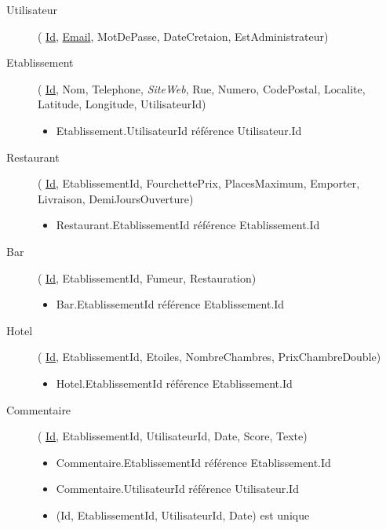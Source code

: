 \documentclass[10pt,a4paper]{article}
\begin{document}
\begin{description}
\item[Utilisateur](
    \underline{Id},
    \underline{Email},
    MotDePasse,
    DateCretaion,
    EstAdministrateur)

\item[Etablissement](
    \underline{Id},
    Nom,
    Telephone,
    \textit{SiteWeb},
    Rue,
    Numero,
    CodePostal,
    Localite,
    Latitude,
    Longitude,
    UtilisateurId)

    \begin{itemize}
        \item Etablissement.UtilisateurId référence Utilisateur.Id
    \end{itemize}

\item[Restaurant](
    \underline{Id},
    EtablissementId,
    FourchettePrix,
    PlacesMaximum,
    Emporter,
    Livraison,
    DemiJoursOuverture)

    \begin{itemize}
        \item Restaurant.EtablissementId référence Etablissement.Id
    \end{itemize}

\item[Bar](
    \underline{Id},
    EtablissementId,
    Fumeur,
    Restauration)

    \begin{itemize}
        \item Bar.EtablissementId référence Etablissement.Id
    \end{itemize}

\item[Hotel](
    \underline{Id},
    EtablissementId,
    Etoiles,
    NombreChambres,
    PrixChambreDouble)

    \begin{itemize}
        \item Hotel.EtablissementId référence Etablissement.Id
    \end{itemize}

\item[Commentaire](
    \underline{Id},
    EtablissementId,
    UtilisateurId,
    Date,
    Score,
    Texte)

    \begin{itemize}
        \item Commentaire.EtablissementId référence Etablissement.Id
        \item Commentaire.UtilisateurId référence Utilisateur.Id
        \item (Id, EtablissementId, UtilisateurId, Date) est unique
    \end{itemize}


\end{description}
\end{document}
